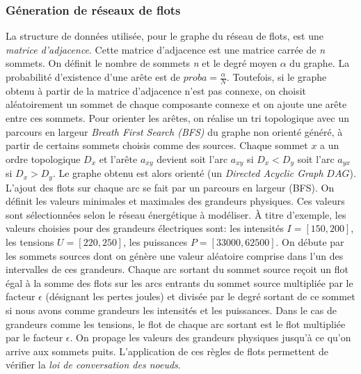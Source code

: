 \subsubsection{G\'eneration de r\'eseaux de flots}
La structure de donn\'ees utilis\'ee, pour le graphe du r\'eseau de flots, est une {\em matrice d'adjacence}.
Cette matrice d'adjacence est une matrice carr\'ee de {\em n} sommets.
On d\'efinit le nombre de sommets {\em n} et le degr\'e moyen  $\alpha$ du graphe. 
La probabilit\'e d'existence d'une ar\^ete est de $proba = \frac{\alpha}{N}$.
Toutefois, si le graphe obtenu \`a partir de la matrice d'adjacence n'est pas connexe, on choisit al\'eatoirement un sommet de chaque composante connexe et on ajoute une ar\^ete entre ces sommets.
\newline
Pour orienter les ar\^etes, on r\'ealise un tri topologique avec un parcours en largeur {\em Breath First Search (BFS)} du graphe non orient\'e g\'en\'er\'e, \`a partir de certains sommets choisis comme des sources. 
Chaque sommet $x$ a un ordre topologique $D_x$ et l'ar\^ete $a_{xy}$ devient soit l'arc $a_{xy}$ si $D_x < D_y$ soit l'arc $a_{yx}$ si $D_x > D_y$. 
Le graphe obtenu est alors orient\'e (un {\em Directed Acyclic Graph} $DAG$).
\newline
L'ajout des flots sur chaque arc se fait par un parcours en largeur (BFS).
On d\'efinit les valeurs minimales et maximales des grandeurs physiques. 
Ces valeurs sont s\'electionn\'ees selon le r\'eseau \'energ\'etique \`a mod\'eliser. 
\`A titre d'exemple, les valeurs choisies pour des grandeurs \'electriques sont: les intensit\'es $I = [150, 200 ]$, les tensions $U = [220, 250]$, les puissances $P = [ 33000, 62500]$. \newline
On d\'ebute par les sommets sources dont on g\'en\`ere une valeur al\'eatoire comprise dans l'un des intervalles de ces grandeurs. 
Chaque arc sortant du sommet source re\c coit  un flot \'egal \`a la somme des flots sur les arcs entrants du sommet source multipli\'ee par le facteur $\epsilon$ (d\'esignant les pertes joules) et divis\'ee par le degr\'e sortant de ce sommet si nous avons comme grandeurs les intensit\'es et les puissances.
Dans le cas de grandeurs comme les tensions, le flot de chaque arc sortant est le flot multipli\'ee par le facteur $\epsilon$. 
On propage les valeurs des grandeurs physiques jusqu'\`a ce qu'on arrive aux sommets puits.
L'application de ces r\`egles de flots permettent de v\'erifier la {\em loi de conversation des noeuds}.

